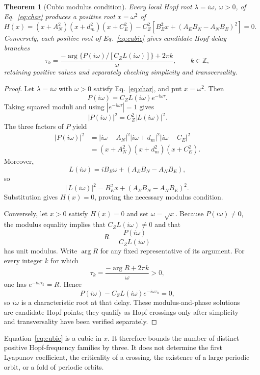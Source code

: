 \documentclass[11pt]{article}
\newtheorem{theorem}{Theorem}
\begin{document}
\begin{theorem}[Cubic modulus condition]
Every local Hopf root $\lambda=i\omega$, $\omega>0$, of Eq.~\eqref{eq:char} produces a positive root $x=\omega^2$ of
\begin{equation}
H(x)=(x+A_N^2)(x+d_m^2)(x+C_E^2)
-C_Z^2\left[B_E^2x+(A_EB_N-A_NB_E)^2\right]=0.
\label{eq:cubic}
\end{equation}
Conversely, each positive root of Eq.~\eqref{eq:cubic} gives candidate Hopf-delay branches
\begin{equation}
\tau_k=\frac{-\arg\{P(i\omega)/[C_ZL(i\omega)]\}+2\pi k}{\omega},
\qquad k\in\mathbb Z,
\label{eq:phase}
\end{equation}
retaining positive values and separately checking simplicity and transversality.
\end{theorem}

\begin{proof}
Let $\lambda=i\omega$ with $\omega>0$ satisfy Eq.~\eqref{eq:char}, and put $x=\omega^2$. Then
\[
P(i\omega)=C_ZL(i\omega)e^{-i\omega\tau}.
\]
Taking squared moduli and using $|e^{-i\omega\tau}|=1$ gives
\[
|P(i\omega)|^2=C_Z^2|L(i\omega)|^2.
\]
The three factors of $P$ yield
\begin{align*}
|P(i\omega)|^2
&=|i\omega-A_N|^2|i\omega+d_m|^2|i\omega-C_E|^2\\
&=(x+A_N^2)(x+d_m^2)(x+C_E^2).
\end{align*}
Moreover,
\[
L(i\omega)=iB_E\omega+(A_EB_N-A_NB_E),
\]
so
\[
|L(i\omega)|^2=B_E^2x+(A_EB_N-A_NB_E)^2.
\]
Substitution gives $H(x)=0$, proving the necessary modulus condition.

Conversely, let $x>0$ satisfy $H(x)=0$ and set $\omega=\sqrt{x}$. Because $P(i\omega)\ne0$, the modulus equality implies that $C_ZL(i\omega)\ne0$ and that
\[
R=\frac{P(i\omega)}{C_ZL(i\omega)}
\]
has unit modulus. Write $\arg R$ for any fixed representative of its argument. For every integer $k$ for which
\[
\tau_k=\frac{-\arg R+2\pi k}{\omega}>0,
\]
one has $e^{-i\omega\tau_k}=R$. Hence
\[
P(i\omega)-C_ZL(i\omega)e^{-i\omega\tau_k}=0,
\]
so $i\omega$ is a characteristic root at that delay. These modulus-and-phase solutions are candidate Hopf points; they qualify as Hopf crossings only after simplicity and transversality have been verified separately.
\end{proof}

Equation~\eqref{eq:cubic} is a cubic in $x$. It therefore bounds the number of distinct positive Hopf-frequency families by three. It does not determine the first Lyapunov coefficient, the criticality of a crossing, the existence of a large periodic orbit, or a fold of periodic orbits.
\end{document}
